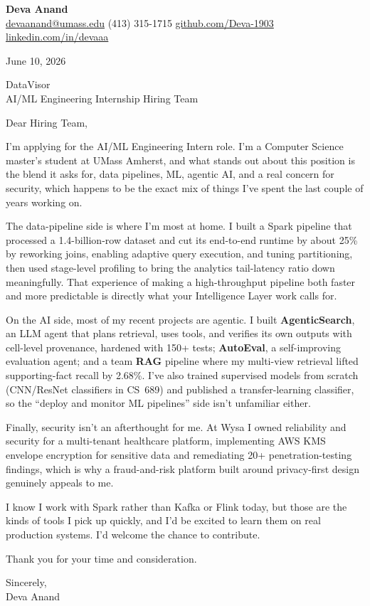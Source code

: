 \documentclass[letterpaper,11pt]{article}
\begin{document}
\begin{center}
  {\LARGE \bfseries \textcolor{ResumeNavy}{Deva Anand}} \\[3pt]
  {\small
  \href{mailto:devaanand@umass.edu}{devaanand@umass.edu} \enspace\textbar\enspace
  (413) 315-1715 \enspace\textbar\enspace
  \href{https://github.com/Deva-1903}{github.com/Deva-1903} \enspace\textbar\enspace
  \href{https://linkedin.com/in/devaaa/}{linkedin.com/in/devaaa}}
\end{center}
\vspace{6pt}

June 10, 2026

\vspace{2pt}
DataVisor \\
AI/ML Engineering Internship Hiring Team

\vspace{6pt}
Dear Hiring Team,

I'm applying for the AI/ML Engineering Intern role. I'm a Computer Science master's student at UMass Amherst, and what stands out about this position is the blend it asks for, data pipelines, ML, agentic AI, and a real concern for security, which happens to be the exact mix of things I've spent the last couple of years working on.

The data-pipeline side is where I'm most at home. I built a Spark pipeline that processed a 1.4-billion-row dataset and cut its end-to-end runtime by about 25\% by reworking joins, enabling adaptive query execution, and tuning partitioning, then used stage-level profiling to bring the analytics tail-latency ratio down meaningfully. That experience of making a high-throughput pipeline both faster and more predictable is directly what your Intelligence Layer work calls for.

On the AI side, most of my recent projects are agentic. I built \textbf{AgenticSearch}, an LLM agent that plans retrieval, uses tools, and verifies its own outputs with cell-level provenance, hardened with 150+ tests; \textbf{AutoEval}, a self-improving evaluation agent; and a team \textbf{RAG} pipeline where my multi-view retrieval lifted supporting-fact recall by 2.68\%. I've also trained supervised models from scratch (CNN/ResNet classifiers in CS~689) and published a transfer-learning classifier, so the ``deploy and monitor ML pipelines'' side isn't unfamiliar either.

Finally, security isn't an afterthought for me. At Wysa I owned reliability and security for a multi-tenant healthcare platform, implementing AWS KMS envelope encryption for sensitive data and remediating 20+ penetration-testing findings, which is why a fraud-and-risk platform built around privacy-first design genuinely appeals to me.

I know I work with Spark rather than Kafka or Flink today, but those are the kinds of tools I pick up quickly, and I'd be excited to learn them on real production systems. I'd welcome the chance to contribute.

\vspace{4pt}
Thank you for your time and consideration.

\vspace{8pt}
Sincerely, \\
Deva Anand
\end{document}
